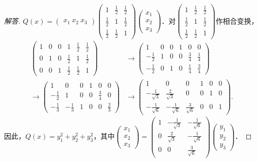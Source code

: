 \documentclass[a4paper,fontset=windows]{ctexbook}
\theoremstyle{definition}
\begin{document}
\begin{proof}[解答]
$Q(x)=\begin{pmatrix}x_1~x_2~x_3\end{pmatrix}\begin{pmatrix}1&\frac{1}{2}&\frac{1}{2} \\ \frac{1}{2}&1&\frac{1}{2} \\ \frac{1}{2}&\frac{1}{2}&1\end{pmatrix}\begin{pmatrix}x_1 \\ x_2 \\ x_3\end{pmatrix}$．对$\begin{pmatrix}1&\frac{1}{2}&\frac{1}{2} \\ \frac{1}{2}&1&\frac{1}{2} \\ \frac{1}{2}&\frac{1}{2}&1\end{pmatrix}$作相合变换，
\begin{align*}
\begin{pmatrix}1&0&0&1&\frac{1}{2}&\frac{1}{2} \\ 0&1&0&\frac{1}{2}&1&\frac{1}{2} \\ 0&0&1&\frac{1}{2}&\frac{1}{2}&1\end{pmatrix}&\to\begin{pmatrix}1&0&0&1&0&0 \\ -\frac{1}{2}&1&0&0&\frac{3}{4}&\frac{1}{4} \\ -\frac{1}{2}&0&1&0&\frac{1}{4}&\frac{3}{4}\end{pmatrix} \\
\to\begin{pmatrix}1&0&0&1&0&0 \\ -\frac{1}{2}&1&0&0&\frac{3}{4}&0 \\ -\frac{1}{3}&-\frac{1}{3}&1&0&0&\frac{2}{3}\end{pmatrix}&\to\begin{pmatrix}1&0&0&1&0&0 \\ -\frac{1}{\sqrt{3}}&\frac{2}{\sqrt{3}}&0&0&1&0 \\ -\frac{1}{\sqrt{6}}&-\frac{1}{\sqrt{6}}&\frac{3}{\sqrt{6}}&0&0&1\end{pmatrix}.
\end{align*}
因此，$Q(x)=y_1^2+y_2^2+y_3^2$，其中$\begin{pmatrix}x_1 \\ x_2 \\ x_3\end{pmatrix}=\begin{pmatrix}1&-\frac{1}{\sqrt{3}}&-\frac{1}{\sqrt{6}} \\ 0&\frac{2}{\sqrt{3}}&-\frac{1}{\sqrt{6}} \\ 0&0&\frac{3}{\sqrt{6}}\end{pmatrix}\begin{pmatrix}y_1 \\ y_2 \\ y_3\end{pmatrix}$．
\end{proof}
\end{document}
